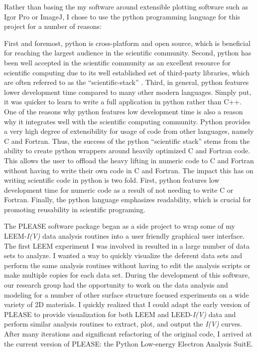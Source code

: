 Rather than basing the my software around extensible plotting software such as Igor Pro or ImageJ, I chose to use the python programming language for this project for a number of reasons:

First and foremost, python is cross-platform and open source, which is beneficial for reaching the largest audience in the scientific community. Second, python has been well accepted in the scientific community as an excellent resource for scientific computing due to its well established set of third-party libraries, which are often referred to as the ``scientific-stack'' \cite{py-scicomp}. Third, in general, python features lower development time compared to many other modern languages. Simply put, it was quicker to learn to write a full application in python rather than C++.  One of the reasons why python features low development time is also a reason why it integrates well with the scientific computing community. Python provides a very high degree of extensibility for usage of code from other languages, namely C and Fortran. Thus, the success of the python ``scientific stack'' stems from the ability to create python wrappers around heavily optimized C and Fortran code. This allows the user to offload the heavy lifting in numeric code to C and Fortran without having to write their own code in C and Fortran. The impact this has on writing scientific code in python is two fold. First, python features low development time for numeric code as a result of not needing to write C or Fortran. Finally, the python language emphasizes readability, which is crucial for promoting reusability in scientific programing.

The PLEASE software package began as a side project to wrap some of my LEEM-\textit{I(V)} data analysis routines into a user friendly graphical user interface. The first LEEM experiment I was involved in resulted in a large number of data sets to analyze. I wanted a way to quickly visualize the deferent data sets and perform the same analysis routines without having to edit the analysis scripts or make multiple copies for each data set. During the development of this software, our research group had the opportunity to work on the data analysis and modeling for a number of other surface structure focused experiments on a wide variety of 2D materials. I quickly realized that I could adapt the early version of PLEASE to provide visualization for both LEEM and LEED-\textit{I(V)} data and perform similar analysis routines to extract, plot, and output the \textit{I(V)} curves. After many iterations and significant refactoring of the original code, I arrived at the current version of PLEASE: the Python Low-energy Electron Analysis SuitE.

